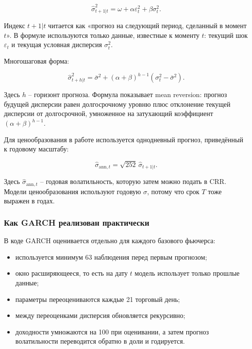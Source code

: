\documentclass[11pt,a4paper]{article}
\begin{document}
\begin{equation}
\hat{\sigma}_{t+1|t}^2
=
\omega
+ \alpha\varepsilon_t^2
+ \beta\sigma_t^2.
\end{equation}

Индекс $t+1|t$ читается как «прогноз на следующий период, сделанный в момент $t$». В формуле используются только данные, известные к моменту $t$: текущий шок $\varepsilon_t$ и текущая условная дисперсия $\sigma_t^2$.

Многошаговая форма:

\begin{equation}
\hat{\sigma}^2_{t+h|t}
=
\bar{\sigma}^2
+(\alpha+\beta)^{h-1}
\left(\sigma_t^2-\bar{\sigma}^2\right).
\end{equation}

Здесь $h$ -- горизонт прогноза. Формула показывает mean reversion: прогноз будущей дисперсии равен долгосрочному уровню плюс отклонение текущей дисперсии от долгосрочной, умноженное на затухающий коэффициент $(\alpha+\beta)^{h-1}$.

Для ценообразования в работе используется однодневный прогноз, приведённый к годовому масштабу:

\begin{equation}
\hat{\sigma}_{\text{ann},t}
=
\sqrt{252}\,\hat{\sigma}_{t+1|t}.
\end{equation}

Здесь $\hat{\sigma}_{\text{ann},t}$ -- годовая волатильность, которую затем можно подать в CRR. Модели ценообразования используют годовую $\sigma$, потому что срок $T$ тоже выражен в годах.

\subsubsection{Как GARCH реализован практически}

В коде GARCH оценивается отдельно для каждого базового фьючерса:

\begin{itemize}
    \item используется минимум 63 наблюдения перед первым прогнозом;
    \item окно расширяющееся, то есть на дату $t$ модель использует только прошлые данные;
    \item параметры переоцениваются каждые 21 торговый день;
    \item между переоценками дисперсия обновляется рекурсивно;
    \item доходности умножаются на 100 при оценивании, а затем прогноз волатильности переводится обратно в доли и годируется.
\end{itemize}
\end{document}
